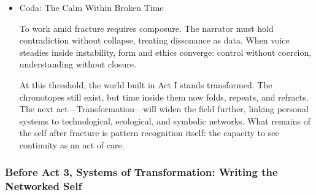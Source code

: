 \documentclass[11pt]{article}
\begin{document}
\begin{itemize}
Sustained fragmentation reveals pattern. Recurring images acquire charge; contradictions reveal system boundaries; simultaneity becomes insight. What looked like chaos resolves into topology—a self understood as relation, not essence.

Ricoeur would call this configuration: synthesis of the heterogeneous at a higher level. Act II ends when the writer perceives pattern within disorder, not before.
\item Coda: The Calm Within Broken Time
\label{sec:orgf93d964}

To work amid fracture requires composure. The narrator must hold contradiction without collapse, treating dissonance as data. When voice steadies inside instability, form and ethics converge: control without coercion, understanding without closure.

At this threshold, the world built in Act I stands transformed. The chronotopes still exist, but time inside them now folds, repeats, and refracts. The next act—Transformation—will widen the field further, linking personal systems to technological, ecological, and symbolic networks. What remains of the self after fracture is pattern recognition itself: the capacity to see continuity as an act of care.
\end{itemize}
\subsubsection*{Before Act 3, Systems of Transformation: Writing the Networked Self}
\label{sec:orgdef3432}
\end{document}
